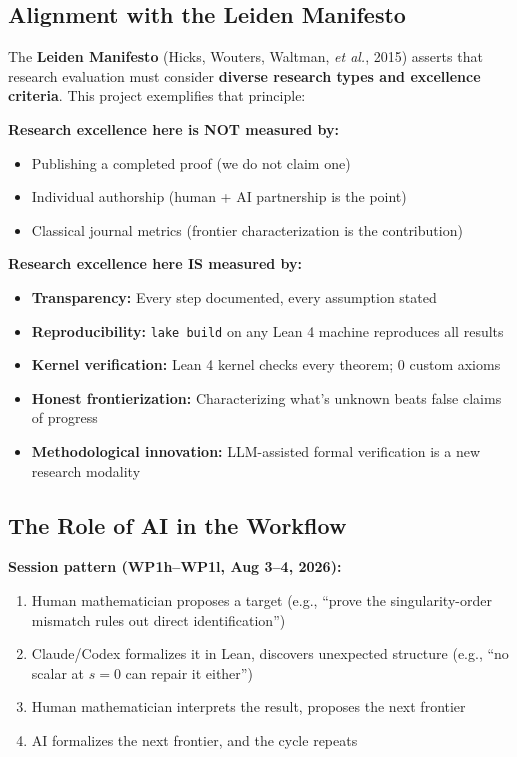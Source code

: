 \documentclass[11pt,a4paper]{article}
\theoremstyle{plain}
\theoremstyle{definition}
\theoremstyle{remark}
\begin{document}
\subsection*{Alignment with the Leiden Manifesto}

The \textbf{Leiden Manifesto} (Hicks, Wouters, Waltman, \emph{et al.}, 2015) asserts that research evaluation must consider \textbf{diverse research types and excellence criteria}. This project exemplifies that principle:

\textbf{Research excellence here is NOT measured by:}
\begin{itemize}[leftmargin=2em]
  \item Publishing a completed proof (we do not claim one)
  \item Individual authorship (human + AI partnership is the point)
  \item Classical journal metrics (frontier characterization is the contribution)
\end{itemize}

\textbf{Research excellence here IS measured by:}
\begin{itemize}[leftmargin=2em]
  \item \checkmark{} \textbf{Transparency:} Every step documented, every assumption stated
  \item \checkmark{} \textbf{Reproducibility:} \texttt{lake build} on any Lean 4 machine reproduces all results
  \item \checkmark{} \textbf{Kernel verification:} Lean 4 kernel checks every theorem; 0 custom axioms
  \item \checkmark{} \textbf{Honest frontierization:} Characterizing what's unknown beats false claims of progress
  \item \checkmark{} \textbf{Methodological innovation:} LLM-assisted formal verification is a new research modality
\end{itemize}

\subsection*{The Role of AI in the Workflow}

\textbf{Session pattern (WP1h--WP1l, Aug 3--4, 2026):}
\begin{enumerate}[label=\arabic*)]
  \item Human mathematician proposes a target (e.g., ``prove the singularity-order mismatch rules out direct identification'')
  \item Claude/Codex formalizes it in Lean, discovers unexpected structure (e.g., ``no scalar at $s=0$ can repair it either'')
  \item Human mathematician interprets the result, proposes the next frontier
  \item AI formalizes the next frontier, and the cycle repeats
\end{enumerate}
\end{document}
